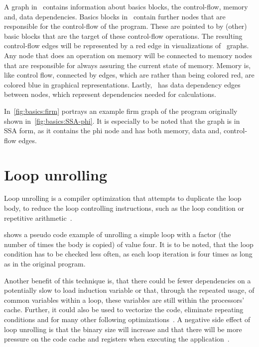 A graph in \libFIRM~contains information about basics blocks, the control-flow, memory and, data dependencies.
Basics blocks in \libFIRM~contain further nodes that are responsible for the control-flow of the program.
These are pointed to by (other) basic blocks that are the target of these control-flow operations.
The resulting control-flow edges will be represented by a red edge in visualizations of \libFIRM~graphs.
Any node that does an operation on memory will be connected to memory nodes that are responsible for always assuring the current state of memory.
Memory is, like control flow, connected by edges, which are rather than being colored red, are colored blue in graphical representations.
Lastly, \libFIRM~has data dependency edges between nodes, which represent dependencies needed for calculations.

In~\cref{fig:basics:firm} portrays an example firm graph of the program originally shown in~\cref{fig:basics:SSA-phi}.
It is especially to be noted that the graph is in SSA form, as it contains the phi node and has both memory, data and, control-flow edges.



\section{Loop unrolling}\label{sec:basics:unrolling}

Loop unrolling is a compiler optimization that attempts to duplicate the loop body, to reduce the loop controlling instructions, such as the loop condition or repetitive arithmetic~\cite{aho_ullman_1979}.

 shows a pseudo code example of unrolling a simple loop with a factor (the number of times the body is copied) of value four.
It is to be noted, that the loop condition has to be checked less often, as each loop iteration is four times as long as in the original program.

Another benefit of this technique is, that there could be fewer dependencies on a potentially slow to load induction variable or that, through the repeated usage, of common variables within a loop, these variables are still within the processors' cache.
Further, it could also be used to vectorize the code, eliminate repeating conditions and for many other following optimizations~\cite{fog_2018}.
A negative side effect of loop unrolling is that the binary size will increase and that there will be more pressure on the code cache and registers when executing the application~\cite{Sarkar2001}.


